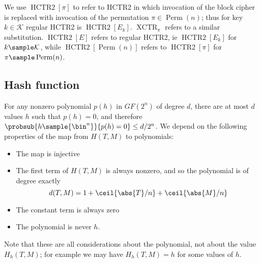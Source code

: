 \documentclass[letterpaper,11pt]{article}
\DeclareMathOperator{\HCTR}{HCTR2}
\DeclareMathOperator{\Perm}{Perm}
\DeclareMathOperator{\XCTR}{XCTR}
\begin{document}
We use \(\HCTR[\pi]\) to refer to HCTR2 in which invocation
of the block cipher is replaced with invocation of the
permutation \(\pi \in \Perm(n)\); thus for key
\(k \in \mathcal{K}\) regular HCTR2 is \(\HCTR[E_k]\).
\(\XCTR_\pi\) refers to a similar substitution.
\(\HCTR[E]\) refers to regular HCTR2,
ie \(\HCTR[E_k]\) for \(k \sample \mathcal{K}\), while
\(\HCTR[\Perm(n)]\) refers to \(\HCTR[\pi]\)
for \(\pi \sample \Perm(n)\).

\subsection{Hash function}\label{hproperties}
For any nonzero polynomial \(p(h)\)
in \(GF(2^n)\) 
of degree \(d\), there are at most \(d\) values \(h\)
such that \(p(h) = 0\), and therefore
\(\probsub{h\sample{\bin^n}}{p(h) = 0} \leq d/2^n\).
We depend on the following properties of the map from 
\(H(T, M)\) to polynomials:
\begin{itemize}
    \item The map is injective
    \item The first term of \(H(T, M)\) is always nonzero,
    and so the polynomial is of degree exactly
    \begin{displaymath}
        d(T, M) = 1 + \ceil{\abs{T}/n} + \ceil{\abs{M}/n}
    \end{displaymath}
    \item The constant term is always zero
    \item The polynomial is never \(h\).
\end{itemize}
Note that these are all considerations about the polynomial,
not about the value \(H_h(T, M)\);
for example we may have \(H_h(T, M) = h\) for some values of \(h\).
\end{document}
